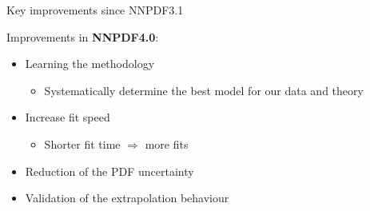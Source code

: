\documentclass[aspectratio=169,10pt]{beamer}
\begin{document}
\begin{frame}[t]{Key improvements since NNPDF3.1}


Improvements in \textbf{NNPDF4.0}:
\begin{itemize}
    \item Learning the methodology
    \begin{itemize}
        \item Systematically determine the {best model} for our data and theory
    \end{itemize}
    \item Increase {fit speed}
    \begin{itemize}
        \item Shorter fit time $\Rightarrow$ more fits
    \end{itemize}
    \item Reduction of the PDF uncertainty
    \item Validation of the {extrapolation behaviour}
\end{itemize}
\end{frame}
\end{document}
